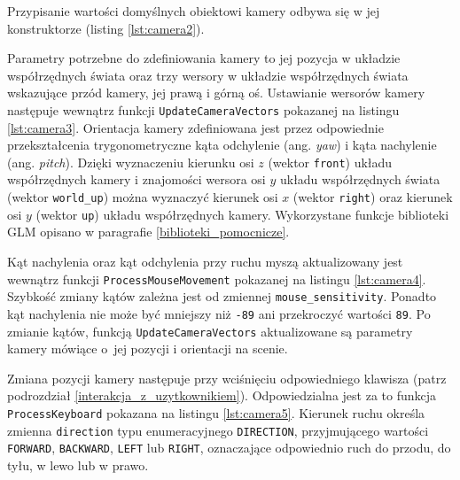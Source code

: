 \documentclass[12pt, twoside, openany]{report}
\begin{document}


Przypisanie wartości domyślnych obiektowi kamery odbywa się w jej konstruktorze (listing \ref{lst:camera2}).



Parametry potrzebne do zdefiniowania kamery to jej pozycja w układzie współrzędnych świata oraz trzy wersory w układzie współrzędnych świata wskazujące przód kamery, jej prawą i górną oś. Ustawianie wersorów kamery następuje wewnątrz funkcji \texttt{UpdateCameraVectors} pokazanej na listingu \ref{lst:camera3}. Orientacja kamery zdefiniowana jest przez odpowiednie przekształcenia trygonometryczne kąta odchylenie (ang. \textit{yaw}) i kąta nachylenie (ang. \textit{pitch}). Dzięki wyznaczeniu kierunku osi $z$ (wektor \texttt{front}) układu współrzędnych kamery i znajomości wersora osi $y$ układu współrzędnych świata (wektor \texttt{world\_up}) można wyznaczyć kierunek osi $x$ (wektor \texttt{right}) oraz kierunek osi $y$ (wektor \texttt{up}) układu współrzędnych kamery. Wykorzystane funkcje biblioteki GLM opisano w paragrafie \ref{biblioteki_pomocnicze}.



Kąt nachylenia oraz kąt odchylenia przy ruchu myszą aktualizowany jest wewnątrz funkcji \texttt{ProcessMouseMovement} pokazanej na listingu \ref{lst:camera4}. Szybkość zmiany kątów zależna jest od zmiennej \texttt{mouse\_sensitivity}. Ponadto kąt nachylenia nie może być mniejszy niż \texttt{-89} ani przekroczyć wartości \texttt{89}. Po zmianie kątów, funkcją \texttt{UpdateCameraVectors} aktualizowane są parametry kamery mówiące o~jej pozycji i orientacji na scenie.



Zmiana pozycji kamery następuje przy wciśnięciu odpowiedniego klawisza (patrz podrozdział \ref{interakcja_z_uzytkownikiem}). Odpowiedzialna jest za to funkcja \texttt{ProcessKeyboard} pokazana na listingu \ref{lst:camera5}. Kierunek ruchu określa zmienna \texttt{direction} typu enumeracyjnego \texttt{DIRECTION}, przyjmującego wartości \texttt{FORWARD}, \texttt{BACKWARD}, \texttt{LEFT} lub \texttt{RIGHT}, oznaczające odpowiednio ruch do przodu, do tyłu, w lewo lub w prawo.
\end{document}
